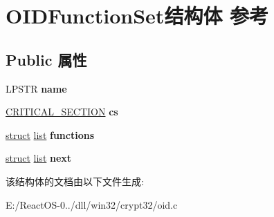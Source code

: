 \hypertarget{struct_o_i_d_function_set}{}\section{O\+I\+D\+Function\+Set结构体 参考}
\label{struct_o_i_d_function_set}
\subsection*{Public 属性}
\begin{DoxyCompactItemize}
\item 
\mbox{\label{struct_o_i_d_function_set_a8330079567b3ebeef4fe04041d7dc6ee}} 
L\+P\+S\+TR {\bfseries name}
\item 
\mbox{\label{struct_o_i_d_function_set_aa51ac779095f08b98b07b96610faed09}} 
\hyperlink{struct___c_r_i_t_i_c_a_l___s_e_c_t_i_o_n}{C\+R\+I\+T\+I\+C\+A\+L\+\_\+\+S\+E\+C\+T\+I\+ON} {\bfseries cs}
\item 
\mbox{\label{struct_o_i_d_function_set_a94993bbefc7e4eeeb57222045b0e61b2}} 
\hyperlink{interfacestruct}{struct} \hyperlink{classlist}{list} {\bfseries functions}
\item 
\mbox{\label{struct_o_i_d_function_set_a61cf3aca732c27881d3129ee76ce8ac9}} 
\hyperlink{interfacestruct}{struct} \hyperlink{classlist}{list} {\bfseries next}
\end{DoxyCompactItemize}


该结构体的文档由以下文件生成\+:\begin{DoxyCompactItemize}
\item 
E\+:/\+React\+O\+S-\/0../dll/win32/crypt32/oid.\+c\end{DoxyCompactItemize}
